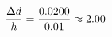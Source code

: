 \documentclass[preview]{standalone}
\begin{document}
\begin{align*}
\special{dvisvgm:raw <g id='unique000'>}\frac{\Delta d}{h} = \frac{0.0200}{0.01} \approx 2.00\special{dvisvgm:raw </g>}
\end{align*}
\end{document}
